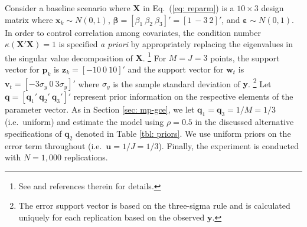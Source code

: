 \documentclass{elsarticle}
\begin{document}
Consider a baseline scenario where $\mathbf{X}$ in Eq.\ (\ref{eq: reparm})
is a $10 \times 3$ design matrix where $\mathbf{x}_k \sim 
N(0,1)$, $\mathbf{\beta}= [\beta_1 ~ \beta_2 ~ \beta_3]'=[1 ~ -3 ~ 2]'$, 
and $\mathbf{\varepsilon} \sim N(0,1)$.
In order to control correlation among covariates, the condition
number $\kappa(\mathbf{X}'\mathbf{X})=1$ is specified \textit{a priori}
by appropriately replacing the eigenvalues in the singular value 
decomposition of $\mathbf{X}$.%
\footnote{See \citet[pg.\ 133]{golan1996} and references therein for 
details.}
For $M=J=3$ points, the support vector for $\mathbf{p}_k$ is 
$\mathbf{z}_k = [- 10 ~ 0 ~ 10]'$ and the support vector for $\mathbf{w}_t$ 
is $\mathbf{v}_t = [- 3\sigma_y ~ 0 ~ 3\sigma_y]'$ where $\sigma_y$ is the sample
standard deviation of $\mathbf{y}$.%
\footnote{The error support vector is based on the three-sigma
rule \citep{pukelsheim1994} and is calculated 
uniquely for each replication based on the observed $\mathbf{y}$.}
Let $\mathbf{q} = [\mathbf{q}_1' ~ 
\mathbf{q}_2' ~ \mathbf{q}_3']'$ represent prior information on the 
respective elements of the parameter vector.
As in Section \ref{sec: mp-gce}, we let $\mathbf{q}_1 = \mathbf{q}_3 = 1/M 
= 1/3$ (i.e.\ uniform) and estimate the model using $\rho=0.5$  in the 
discussed alternative specifications of $\mathbf{q}_2$ denoted in Table \ref{tbl: priors}.
We use uniform priors on the error term throughout (i.e.\ $\mathbf{u} = 1/J = 1/3$).
Finally, the experiment is conducted with $N=1,000$ replications.

\footnotesize
{}
\normalsize
\end{document}
